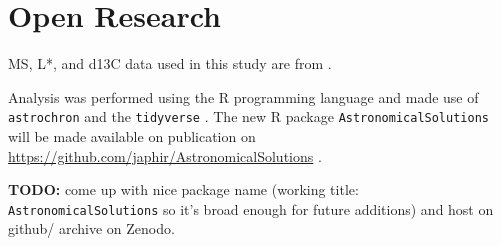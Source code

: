 \documentclass[draft]{agujournal2019}
\begin{document}
%
%

%

%



\section*{Open Research}

\Gls{MS}, \gls{L*}, and \gls{d13C} data used in this study are from .

Analysis was performed using the R programming language \cite{RCoreTeam2020} and made use of \texttt{astrochron}  and the \texttt{tidyverse} .
The new R package \texttt{AstronomicalSolutions} will be made available on publication on \url{https://github.com/japhir/AstronomicalSolutions} .

\textbf{TODO:} come up with nice package name (working title: \texttt{AstronomicalSolutions} so it's broad enough for future additions) and host on github/ archive on Zenodo.


\end{document}
